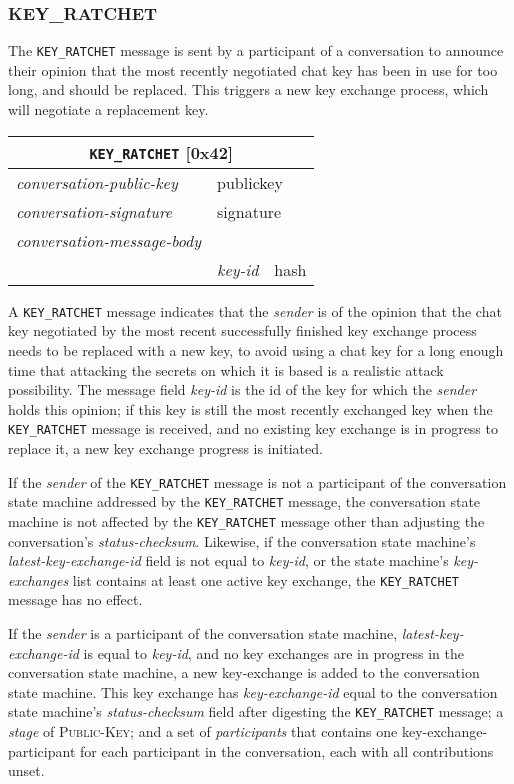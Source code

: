 \documentclass{article}
\def\message#1{\texttt{#1}}
\def\field#1{\textit{#1}}
\def\smfield#1{\textsl{#1}}
\def\type#1{\textsf{#1}}
\newenvironment{conversationmessage}[2]{
\newcommand{\messagefield}[2]{
& \field{##1} & \type{##2} \\
\hline
}
\hspace{2em minus 2em}\begin{tabular}{|l|l|l|}
\hline
\multicolumn{3}{|c|}{\message{#1} [#2]} \\
\hline
\hline
\field{conversation-public-key} & \multicolumn{2}{l|}{\type{publickey}} \\
\hline
\field{conversation-signature} & \multicolumn{2}{l|}{\type{signature}} \\
\hline
\field{conversation-message-body} & \multicolumn{2}{l|}{} \\
\hline
}{
\end{tabular}
}
\begin{document}
\subsubsection{KEY\_RATCHET}
\label{sec:messages/key-ratchet}

The \message{KEY\_RATCHET} message is sent by a participant of a conversation to announce their opinion that the most recently negotiated chat key has been in use for too long, and should be replaced.
This triggers a new key exchange process, which will negotiate a replacement key.

\begin{conversationmessage}{KEY\_RATCHET}{0x42}
\messagefield{key-id}{hash}
\end{conversationmessage}

A \message{KEY\_RATCHET} message indicates that the \field{sender} is of the opinion that the chat key negotiated by the most recent successfully finished key exchange process needs to be replaced with a new key, to avoid using a chat key for a long enough time that attacking the secrets on which it is based is a realistic attack possibility.
The message field \field{key-id} is the id of the key for which the \field{sender} holds this opinion; if this key is still the most recently exchanged key when the \message{KEY\_RATCHET} message is received, and no existing key exchange is in progress to replace it, a new key exchange progress is initiated.

If the \field{sender} of the \message{KEY\_RATCHET} message is not a participant of the conversation state machine addressed by the \message{KEY\_RATCHET} message, the conversation state machine is not affected by the \message{KEY\_RATCHET} message other than adjusting the conversation's \smfield{status-checksum}.
Likewise, if the conversation state machine's \smfield{latest-key-exchange-id} field is not equal to \field{key-id}, or the state machine's \smfield{key-exchanges} list contains at least one active key exchange, the \message{KEY\_RATCHET} message has no effect.

If the \field{sender} is a participant of the conversation state machine, \smfield{latest-key-exchange-id} is equal to \field{key-id}, and no key exchanges are in progress in the conversation state machine, a new \type{key-exchange} is added to the conversation state machine.
This key exchange has \smfield{key-exchange-id} equal to the conversation state machine's \smfield{status-checksum} field after digesting the \message{KEY\_RATCHET} message; a \smfield{stage} of \textsc{Public-Key}; and a set of \smfield{participants} that contains one \type{key-exchange-participant} for each participant in the conversation, each with all contributions unset.
\end{document}
